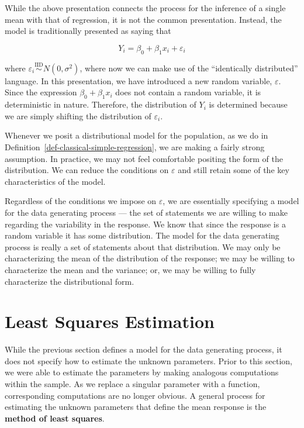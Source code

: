 \documentclass[
  letterpaper,
  DIV=11,
  numbers=noendperiod]{scrreprt}
\theoremstyle{definition}
\theoremstyle{definition}
\theoremstyle{plain}
\theoremstyle{remark}
\begin{document}
While the above presentation connects the process for the inference of a
single mean with that of regression, it is not the common presentation.
Instead, the model is traditionally presented as saying that

\[Y_i = \beta_0 + \beta_1 x_i + \varepsilon_i\]

where
\(\varepsilon_i \stackrel{\text{IID}}{\sim} N\left(0, \sigma^2\right)\),
where now we can make use of the ``identically distributed'' language.
In this presentation, we have introduced a new random variable,
\(\varepsilon\). Since the expression \(\beta_0 + \beta_1 x_i\) does not
contain a random variable, it is deterministic in nature. Therefore, the
distribution of \(Y_i\) is determined because we are simply shifting the
distribution of \(\varepsilon_i\).

Whenever we posit a distributional model for the population, as we do in
Definition~\ref{def-classical-simple-regression}, we are making a fairly
strong assumption. In practice, we may not feel comfortable positing the
form of the distribution. We can reduce the conditions on
\(\varepsilon\) and still retain some of the key characteristics of the
model.

Regardless of the conditions we impose on \(\varepsilon\), we are
essentially specifying a model for the data generating process --- the
set of statements we are willing to make regarding the variability in
the response. We know that since the response is a random variable it
has some distribution. The model for the data generating process is
really a set of statements about that distribution. We may only be
characterizing the mean of the distribution of the response; we may be
willing to characterize the mean and the variance; or, we may be willing
to fully characterize the distributional form.

\hypertarget{least-squares-estimation}{%
\section{Least Squares Estimation}\label{least-squares-estimation}}

While the previous section defines a model for the data generating
process, it does not specify how to estimate the unknown parameters.
Prior to this section, we were able to estimate the parameters by making
analogous computations within the sample. As we replace a singular
parameter with a function, corresponding computations are no longer
obvious. A general process for estimating the unknown parameters that
define the mean response is the \textbf{method of least squares}.
\end{document}
